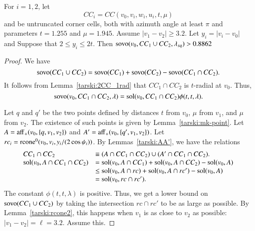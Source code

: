 \begin{lemma} 
For $i=1,2$, let $$CC_i =CC(v_0,v_i,w_i,u_i,t,\mu)$$ and 
be untruncated corner cells, both
with azimuth angle at least $\pi$ and parameters $t=1.255$ and 
$\mu=1.945$.
Assume $|v_1-v_2|\ge 3.2$.  Let $y_i =|v_i-v_0|$ and
Suppose that
$2\le y_i\le 2t$.  Then
${\operatorname{sovo}}(v_0,CC_1\cup CC_2,\lambda_{sq}) > 0.8862$ 
\end{lemma}


\begin{proof}
%
We have
 $$
 {\operatorname{sovo}}(CC_1\cup CC_2)=
 {\operatorname{sovo}}(CC_1)+{\operatorname{sovo}}(CC_2)-{\operatorname{sovo}}(CC_1\cap CC_2).
 $$
It follows from Lemma~\ref{tarski:2CC_1rad} that
$CC_1\cap CC_2$ is $t$-radial at $v_0$.  Thus,
$${\operatorname{sovo}}(v_0,CC_1\cap CC_2,\lambda) =
  \operatorname{sol}(v_0,CC_1\cap CC_2)\phi(t,t,\lambda).$$

Let $q$ and $q'$ be the two points defined by distances
$t$ from $v_0$, $\mu$ from $v_1$, and $\mu$ from $v_2$.
The existence of such points is given by Lemma~\ref{tarski:mk-point}.
Let $A={\operatorname{aff}}_+(v_0,\{q,v_1,v_2\})$ and
$A'={\operatorname{aff}}_+(v_0,\{q',v_1,v_2\})$.
Let $rc_i = {\operatorname{rcone}}^0(v_0,v_i,y_i/(2\cos\psi_i))$.
By Lemmas~\ref{tarski:AA'}, we have the relations
$$
\begin{array}{lll}
CC_1\cap CC_2 &\equiv (A\cap CC_1\cap CC_2) \cup (A'\cap CC_1\cap CC_2).\\
\operatorname{sol}(v_0,A\cap CC_1\cap CC_2) &= \operatorname{sol}(v_0,A\cap CC_1) + \operatorname{sol}(v_0,A\cap CC_2)
  -\operatorname{sol}(v_0,A)\\
    &\le \operatorname{sol}(v_0,A\cap rc) + \operatorname{sol}(v_0,A\cap rc') - \operatorname{sol}(v_0,A)\\
    &= \operatorname{sol}(v_0, rc \cap rc').
\end{array}
$$
The constant $\phi(t,t,\lambda)$ is positive.  Thus, we
get a lower bound on ${\operatorname{sovo}}(CC_1\cup CC_2)$ by taking 
the intersection $rc \cap rc'$ to be as large as possible.
By Lemma~\ref{tarski:rcone2}, 
this happens when $v_1$ is as close to $v_2$ as possible:
$|v_1-v_2|=\ell=3.2$.  Assume this.


\end{proof}
